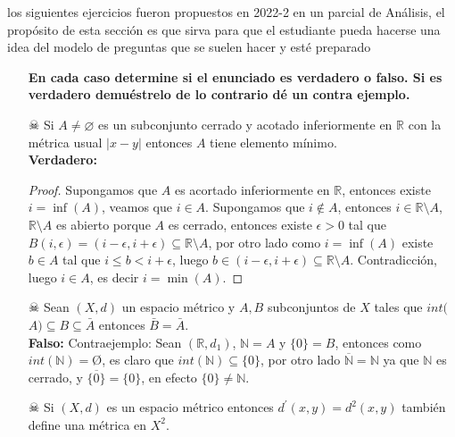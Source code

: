 \begin{note}
 los siguientes ejercicios fueron propuestos en 2022-2 en un parcial de Análisis, el propósito de esta sección es que sirva para que el estudiante pueda hacerse una idea del modelo de preguntas que se suelen hacer y esté preparado
\end{note}


\begin{itemize}

\item[]\textbf{En cada caso determine si el enunciado es verdadero o falso. Si es verdadero demuéstrelo de lo contrario dé un contra ejemplo.}

    \item[☠]Si $A \neq \varnothing$ es un subconjunto cerrado y acotado inferiormente en $\mathbb{R}$ con la métrica usual $|x-y|$ entonces $A$ tiene elemento mínimo.\\
    
    \textbf{Verdadero:}\\
    
    \begin{proof}
        Supongamos que $A$ es acortado inferiormente en $\mathbb{R}$, entonces existe $i=\inf(A)$, veamos que $i\in A$. Supongamos que $i \not \in A$, entonces $i \in \mathbb{R}\setminus A$, $\mathbb{R}\setminus A$ es abierto porque $A$ es cerrado, entonces existe $\epsilon>0$ tal que $B(i,\epsilon)=(i-\epsilon,i+\epsilon)\subseteq \mathbb{R}\setminus A$, por otro lado como $i=\inf(A)$ existe $b\in A$ tal que $i\leq b< i+\epsilon$, luego $b\in (i-\epsilon,i+\epsilon)\subseteq \mathbb{R}\setminus A$. Contradicción, luego $i \in A$, es decir $i=\min(A)$.
        
    \end{proof}
    
    \item[☠]Sean $(X, d)$ un espacio métrico y $A, B$ subconjuntos de $X$ tales que $int($$A) \subseteq B \subseteq \bar{A}$ entonces $\bar{B}=\bar{A}$.\\
    
    \textbf{Falso: }Contraejemplo: Sean $(\mathbb{R},d_1)$, $\mathbb{N}=A$ y $\{0\}=B$, entonces como $int(\mathbb{N})=$\O, es claro que $int(\mathbb{N})\subseteq\{0\}$, por otro lado $\overline{\mathbb{N}}=\mathbb{N}$ ya que $\mathbb{N}$ es cerrado, y $\overline{\{0\}}=\{0\}$, en efecto $\{0\}\neq \mathbb{N}$.
    
    \item[☠]Si $(X, d)$ es un espacio métrico entonces $d^{\prime}(x, y)=d^2(x, y)$ también define una métrica en $X^2$.
    

\end{itemize}
